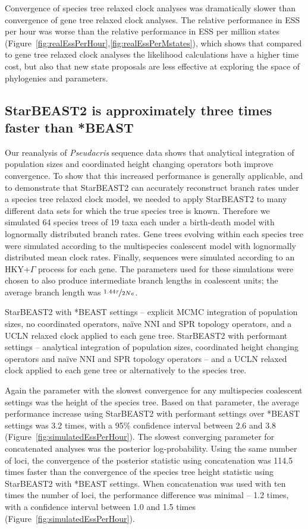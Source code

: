 \documentclass[12pt]{article}
\begin{document}
Convergence of species tree relaxed clock analyses was dramatically slower than
convergence of gene tree relaxed clock analyses. The relative performance in ESS
per hour was worse than the relative performance in ESS per million states
(Figure~\ref{fig:realEssPerHour},\ref{fig:realEssPerMstates}), which shows that
compared to gene tree relaxed clock analyses the likelihood calculations have a
higher time cost, but also that new state proposals are less effective at
exploring the space of phylogenies and parameters.

\subsection{StarBEAST2 is approximately three times faster than *BEAST}

Our reanalysis of \textit{Pseudacris} sequence data shows that analytical
integration of population sizes and coordinated height changing operators both
improve convergence. To show that this increased performance is generally
applicable, and to demonstrate that StarBEAST2 can accurately reconstruct branch
rates under a species tree relaxed clock model, we needed to apply StarBEAST2 to
many different data sets for which the true species tree is known. Therefore we
simulated 64 species trees of 19 taxa each under a birth-death model with
lognormally distributed branch rates. Gene trees evolving within each species
tree were simulated according to the multispecies coalescent model with
lognormally distributed mean clock rates. Finally, sequences were simulated
according to an HKY+$\Gamma$ process for each gene. The parameters used for
these simulations were chosen to also produce intermediate branch lengths in
coalescent units; the average branch length was $\nicefrac{1.44\tau}{2Ne}$.

StarBEAST2 with *BEAST settings -- explicit MCMC integration of population
sizes, no coordinated operators, na\"ive NNI and SPR topology operators, and a
UCLN relaxed clock applied to each gene tree. StarBEAST2 with performant
settings -- analytical integration of population sizes, coordinated height
changing operators and na\"ive NNI and SPR topology operators -- and a UCLN
relaxed clock applied to each gene tree or alternatively to the species tree.

Again the parameter with the slowest convergence for any multispecies coalescent
settings was the height of the species tree. Based on that parameter, the
average performance increase using StarBEAST2 with performant settings over
*BEAST settings was 3.2 times, with a 95\% confidence interval between 2.6 and
3.8 (Figure~\ref{fig:simulatedEssPerHour}). The slowest converging parameter for
concatenated analyses was the posterior log-probability. Using the same number
of loci, the convergence of the posterior statistic using concatenation was
114.5 times faster than the convergence of the species tree height statistic
using StarBEAST2 with *BEAST settings. When concatenation was used with ten
times the number of loci, the performance difference was minimal -- 1.2 times,
with a confidence interval between 1.0 and 1.5 times
(Figure~\ref{fig:simulatedEssPerHour}).
\end{document}
